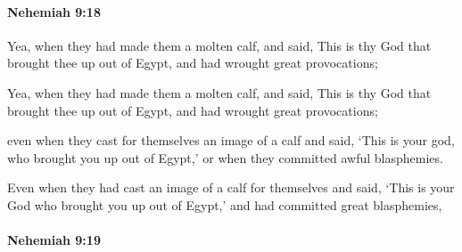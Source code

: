 		\paragraph{Nehemiah 9:18} %
			\label{NEHEMIAH-9-18}

			Yea, when they had made them a molten calf, and said, This is thy God that brought thee up out of Egypt, and had wrought great provocations;

			\begin{versebox}
					\item[BHS] 
					\item[LXX] 
					\item[ASV] Yea, when they had made them a molten calf, and said, This is thy God that brought thee up out of Egypt, and had wrought great provocations;
					\item[NIV] even when they cast for themselves an image of a calf and said, ‘This is your god, who brought you up out of Egypt,’ or when they committed awful blasphemies.
					\item[NRSV] Even when they had cast an image of a calf for themselves and said, ‘This is your God who brought you up out of Egypt,’ and had committed great blasphemies,
			\end{versebox}

		\paragraph{Nehemiah 9:19} %
			\label{NEHEMIAH-9-19}

